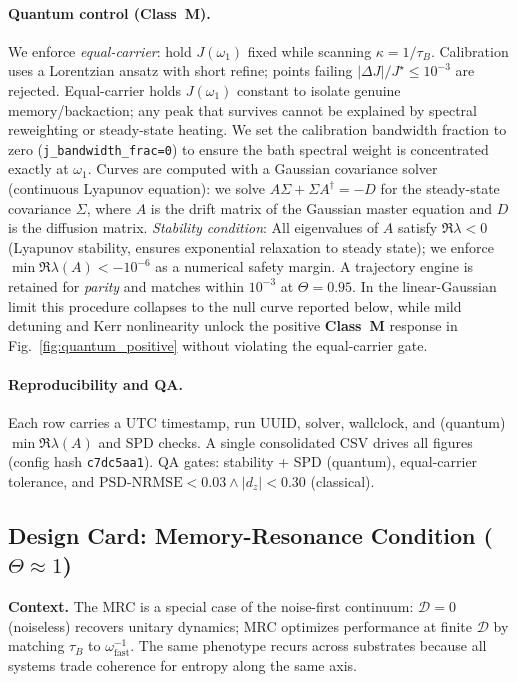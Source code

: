\documentclass[11pt,letterpaper]{article}
\newcommand{\confighash}{c7dc5aa1}
\DeclareRobustCommand{\classM}{\textbf{Class~M}\xspace}
\DeclareRobustCommand{\GatePSD}{\ensuremath{\text{PSD-NRMSE}<0.03}\xspace}
\DeclareRobustCommand{\GateDZ}{\ensuremath{\lvert d_z\rvert<0.30}\xspace}
\DeclareRobustCommand{\GateEQ}{\ensuremath{\GatePSD \wedge \GateDZ}\xspace}
\begin{document}
\paragraph*{Quantum control (\classM).}
We enforce \emph{equal-carrier}: hold $J(\omega_1)$ fixed while scanning $\kappa=1/\tau_B$. Calibration uses a Lorentzian ansatz with short refine; points failing \textbf{$|\Delta J|/J^\star\le 10^{-3}$} are rejected. Equal-carrier holds $J(\omega_1)$ constant to isolate genuine memory/backaction; any peak that survives cannot be explained by spectral reweighting or steady-state heating. We set the calibration bandwidth fraction to zero (\texttt{j\_bandwidth\_frac=0}) to ensure the bath spectral weight is concentrated exactly at $\omega_1$. Curves are computed with a Gaussian covariance solver (continuous Lyapunov equation): we solve $A\Sigma + \Sigma A^\dagger = -D$ for the steady-state covariance $\Sigma$, where $A$ is the drift matrix of the Gaussian master equation and $D$ is the diffusion matrix. \emph{Stability condition}: All eigenvalues of $A$ satisfy $\Re\lambda < 0$ (Lyapunov stability, ensures exponential relaxation to steady state); we enforce $\min\Re\lambda(A) < -10^{-6}$ as a numerical safety margin. A trajectory engine is retained for \emph{parity} and matches within $10^{-3}$ at $\Theta=0.95$. In the linear-Gaussian limit this procedure collapses to the null curve reported below, while mild detuning and Kerr nonlinearity unlock the positive \classM{} response in Fig.~\ref{fig:quantum_positive} without violating the equal-carrier gate.

\paragraph*{Reproducibility and QA.}
Each row carries a UTC timestamp, run UUID, solver, wallclock, and (quantum) $\min \Re \lambda(A)$ and SPD checks. A single consolidated CSV drives all figures (config hash \texttt{\confighash}). QA gates: stability + SPD (quantum), equal-carrier tolerance, and \GateEQ{} (classical).

\subsection{Design Card: Memory-Resonance Condition ($\Theta \approx 1$)}
\label{sec:design_card}

\textbf{Context.} The MRC is a special case of the noise-first continuum: 
$\mathcal{D}=0$ (noiseless) recovers unitary dynamics; MRC optimizes 
performance at finite $\mathcal{D}$ by matching $\tau_B$ to 
$\omega_{\mathrm{fast}}^{-1}$. The same phenotype recurs across substrates 
because all systems trade coherence for entropy along the same axis.
\end{document}

